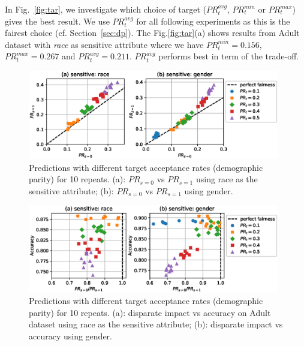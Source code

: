 In Fig.~\ref{fig:tar}, we investigate which choice of target ($\mathit{PR}_t^{avg}$, $\mathit{PR}_t^{min}$ or $\mathit{PR}_t^{max}$)
gives the best result.
We use $\mathit{PR}_t^{avg}$ for all following experiments as this is the fairest choice (cf. Section~\ref{sec:dp}).
The Fig.\ref{fig:tar}(a) shows results from Adult dataset with \emph{race} as sensitive attribute
where we have $\mathit{PR}_t^{min}=0.156$, $\mathit{PR}_t^{max}=0.267$ and $\mathit{PR}_t^{avg} =0.211$.
$\mathit{PR}_t^{avg}$ performs best in term of the trade-off.%
\begin{figure}[t]
  \centering
  \includegraphics[width=0.98\textwidth]{./figures/adult_parity_scatter_pr_pr.eps}
  \caption{
    Predictions with different target acceptance rates (demographic parity) for 10 repeats.
    (a): $\mathit{PR}_{s=0}$ vs $\mathit{PR}_{s=1}$ using race as the sensitive attribute;
    (b): $\mathit{PR}_{s=0}$ vs $\mathit{PR}_{s=1}$ using gender.
  }%
  \label{fig:adult_parity_scatter_pr_pr}
\end{figure}
\begin{figure}[t]
  \centering
  \includegraphics[width=0.98\textwidth]{./figures/adult_parity_scatter_acc.eps}
  \caption{
    Predictions with different target acceptance rates (demographic parity) for 10 repeats.
    (a): disparate impact vs accuracy on Adult dataset using race as the sensitive attribute;
    (b): disparate impact vs accuracy using gender.
  }%
  \label{fig:adult_parity_scatter_acc}
\end{figure}

